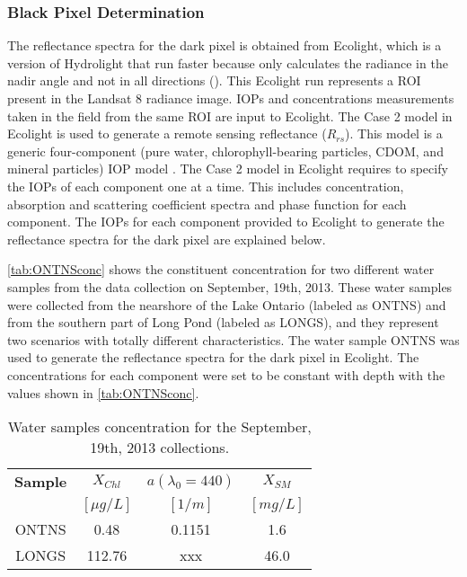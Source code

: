 \subsubsection{Black Pixel Determination}
\label{subsubsec:blackpixel}

The reflectance spectra for the dark pixel is obtained from { Ecolight}, which is a version of Hydrolight that run faster because only calculates the radiance in the nadir angle and not in all directions (\cite{MobleyHEtech}). This Ecolight run represents a ROI present in the Landsat 8 radiance image. IOPs and concentrations measurements taken in the field from the same ROI are input to Ecolight. The Case 2 model in Ecolight is used to generate a remote sensing reflectance ($R_{rs}$). This model is a generic four-component (pure water, chlorophyll-bearing particles, CDOM, and mineral particles) IOP model \cite{MobleyHEtech}. The Case 2 model in Ecolight requires to specify the IOPs of each component one at a time. This includes concentration, absorption and scattering coefficient spectra and phase function for each component. The IOPs for each component provided to Ecolight to generate the reflectance spectra for the dark pixel are explained below.

\autoref{tab:ONTNSconc} shows the constituent concentration for two different water samples from the data collection on September, 19th, 2013. These water samples were collected from the nearshore of the Lake Ontario (labeled as ONTNS) and from the southern part of Long Pond (labeled as LONGS), and they represent two scenarios with totally different characteristics. The water sample ONTNS was used to generate the reflectance spectra for the dark pixel in Ecolight. The concentrations for each component were set to be constant with depth with the values shown in \autoref{tab:ONTNSconc}. 
\vspace{.5cm}
\begin{table}[!ht]
\caption{ Water samples concentration for the September, 19th, 2013 collections. \label{tab:ONTNSconc} } 
\centering
\begin{tabular}{c|c|c|c} 
 \bfseries{Sample} & \bfseries{$X_{Chl}$} & \bfseries{$a(\lambda_0=440)$}& \bfseries{$X_{SM}$}\\
 & $[\mu g/L]$ & $[1/m]$ & $[mg/L]$ \\ \hline \hline
ONTNS & 0.48 & 0.1151 & 1.6\\ 
LONGS & 112.76 & xxx & 46.0\\ 
 \end{tabular}
\end{table}

